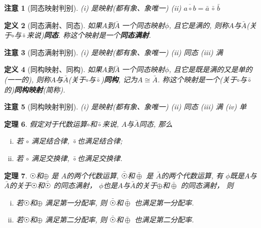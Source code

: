 \documentclass[UTF8]{ctexart}
\newtheorem{Definition}{定义}%
\newtheorem{Theorem}[Definition]{定理}
\newtheorem{Remark}[Definition]{注意}
\begin{document}
\begin{Remark}[同态映射判别]
(i) 是映射(都有象、象唯一) (ii) $ \overline{a \circ b} = \bar{a} \,{\bar{\circ}}\, \bar{b}$
\end{Remark}

\begin{Definition}[同态满射、同态]
如果$A$到$\bar{A}\;${}\;一个同态映射$\phi$, 且它是满的, 则称$A$与$\bar{A}$\;(关于$\circ$与$\bar{\circ}$来说)\textbf{同态}. 称这个映射是一个\textbf{同态满射}.
\end{Definition}

\begin{Remark}[同态满射判别]
(i) 是映射(都有象、象唯一) (ii) 同态 (iii) 满
\end{Remark}

\begin{Definition}[同构映射、同构]
如果$A$到$\bar{A}\;${}\;一个同态映射$\phi$, 且它是既是满的又是单的(一一的), 则称$A$与$\bar{A}$(关于$\circ$与$\bar{\circ}$)\textbf{同构}, 记为$A \cong
 \bar{A}$. 称这个映射是一个(关于$\circ$与$\bar{\circ}$的)\textbf{同构映射}(简称).
\end{Definition}

\begin{Remark}[同构映射判别]
(i) 是映射(都有象、象唯一) (ii) 同态 (iii) 满 (iv) 单
\end{Remark}

\begin{Theorem}
假定对于代数运算$\circ$和$\bar{\circ}$来说, $A$与$\bar{A}$同态, 那么
\begin{enumerate}[i)]
\item 若 $\circ$ 满足结合律, $\bar{\circ}$也满足结合律;
\item 若 $\circ$ 满足交换律, $\bar{\circ}$也满足交换律.
\end{enumerate}
\end{Theorem}

\begin{Theorem}
$ \astrosun $和$ \oplus $ 是 $A$的两个代数运算, 
$ \bar{\astrosun} $和$\bar{\oplus} $ 是 $\bar{A}$的两个代数运算,
有
$\phi$既是$A$与$\bar{A}$的关于$ \astrosun $和$\bar{\astrosun}$ 的同态满射，
$\phi$也是$A$与$\bar{A}$的关于$ \oplus $和$\bar{\oplus}$ 的同态满射，
则 
\begin{enumerate}[i)]
\item 若$ \astrosun$和$ \oplus $  满足第一分配率, 则 $ \bar{\astrosun} $和$\bar{\oplus} $ 也满足第一分配率.
\item 若$ \astrosun$和$\oplus $  满足第二分配率, 则 $ \bar{\astrosun} $和$\bar{\oplus} $ 也满足第二分配率.
\end{enumerate}
\end{Theorem}
\end{document}
